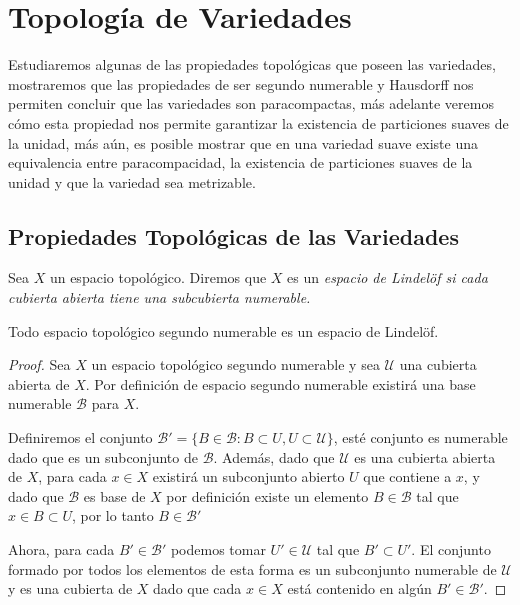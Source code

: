 \appendix
\chapter{Topología de Variedades}\label{Anexo: Topologia De Variedades}

Estudiaremos algunas de las propiedades topológicas que poseen las variedades, mostraremos que las propiedades de ser segundo numerable y Hausdorff nos permiten concluir que las variedades son paracompactas, más adelante veremos cómo esta propiedad nos permite garantizar la existencia de particiones suaves de la unidad, más aún, es posible mostrar que en una variedad suave existe una equivalencia entre paracompacidad, la existencia de particiones suaves de la unidad y que la variedad sea metrizable.

\section{Propiedades Topológicas de las Variedades}

\begin{definition}\label{Definición: Lindelöf}
	Sea $X$ un espacio topológico. Diremos que $X$ es un \it{espacio de Lindelöf} si cada cubierta abierta tiene una subcubierta numerable.
\end{definition}

\begin{theorem}
	Todo espacio topológico segundo numerable es un espacio de Lindelöf.
\end{theorem}

\begin{proof}
	Sea $X$ un espacio topológico segundo numerable y sea $\mathcal{U}$ una cubierta abierta de $X$. Por definición de espacio segundo numerable existirá una base numerable $\mathcal{B}$ para $X$.

	Definiremos el conjunto $\mathcal{B}' = \{B \in \mathcal{B} : B \subset U, U \subset \mathcal{U}\}$, esté conjunto es numerable dado que es un subconjunto de $\mathcal{B}$. Además, dado que $\mathcal{U}$ es una cubierta abierta de $X$, para cada $x \in X$ existirá un subconjunto abierto $U$ que contiene a $x$, y dado que $\mathcal{B}$ es base de $X$ por definición existe un elemento $B \in \mathcal{B}$ tal que $x \in B \subset U$, por lo tanto $B \in \mathcal{B}'$

	Ahora, para cada $B' \in \mathcal{B}'$ podemos tomar $U' \in \mathcal{U}$ tal que $B' \subset U'$. El conjunto formado por todos los elementos de esta forma es un subconjunto numerable de $\mathcal{U}$ y es una cubierta de $X$ dado que cada $x \in X$ está contenido en algún $B' \in \mathcal{B}'$.
\end{proof}

